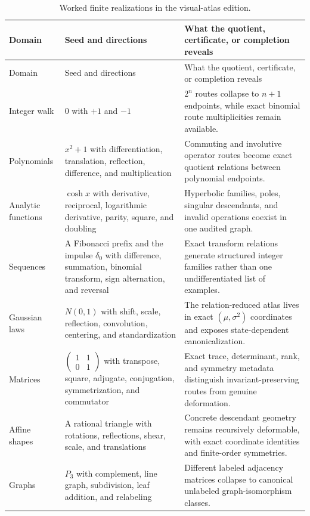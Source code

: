 \begin{longtable}{L{0.17\textwidth}L{0.29\textwidth}L{0.43\textwidth}}
\caption{Worked finite realizations in the visual-atlas edition.}\label{tab:worked-realizations}\\
\toprule
Domain & Seed and directions & What the quotient, certificate, or completion reveals \\
\midrule
\endfirsthead
\toprule
Domain & Seed and directions & What the quotient, certificate, or completion reveals \\
\midrule
\endhead
Integer walk & $0$ with $+1$ and $-1$ & $2^n$ routes collapse to $n+1$ endpoints, while exact binomial route multiplicities remain available. \\
Polynomials & $x^2+1$ with differentiation, translation, reflection, difference, and multiplication & Commuting and involutive operator routes become exact quotient relations between polynomial endpoints. \\
Analytic functions & $\cosh x$ with derivative, reciprocal, logarithmic derivative, parity, square, and doubling & Hyperbolic families, poles, singular descendants, and invalid operations coexist in one audited graph. \\
Sequences & A Fibonacci prefix and the impulse $\delta_0$ with difference, summation, binomial transform, sign alternation, and reversal & Exact transform relations generate structured integer families rather than one undifferentiated list of examples. \\
Gaussian laws & $N(0,1)$ with shift, scale, reflection, convolution, centering, and standardization & The relation-reduced atlas lives in exact $(\mu,\sigma^2)$ coordinates and exposes state-dependent canonicalization. \\
Matrices & $\left(\begin{smallmatrix}1&1\\0&1\end{smallmatrix}\right)$ with transpose, square, adjugate, conjugation, symmetrization, and commutator & Exact trace, determinant, rank, and symmetry metadata distinguish invariant-preserving routes from genuine deformation. \\
Affine shapes & A rational triangle with rotations, reflections, shear, scale, and translations & Concrete descendant geometry remains recursively deformable, with exact coordinate identities and finite-order symmetries. \\
Graphs & $P_3$ with complement, line graph, subdivision, leaf addition, and relabeling & Different labeled adjacency matrices collapse to canonical unlabeled graph-isomorphism classes. \\

\end{longtable}
